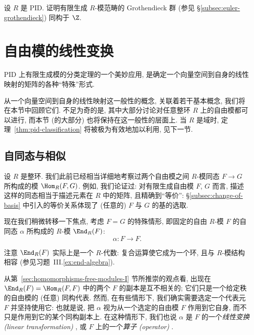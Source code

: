 \begin{prob}\label{ex:grothendieck-pid}
设 $R$ 是 PID. 证明有限生成 $R$-模范畴的 Grothendieck 群 (参见 §\ref{subsec:euler-grothendieck}) 同构于 $\Z$.
\end{prob}

\section{自由模的线性变换}
\label{sec:linear-transformations-free}

PID 上有限生成模的分类定理的一个美妙应用, 是确定一个向量空间到自身的线性映射的矩阵的各种``特殊''形式.

从一个向量空间到自身的线性映射这一般性的概念, 关联着若干基本概念, 我们将在本节中回顾它们. 不足为奇的是, 其中大部分讨论对任意整环 $R$ 上的自由模都可以进行, 而本节 (的大部分) 也将保持在这一般性的层面上. 当 $R$ 是域时, 定理~\ref{thm:pid-classification} 将被极为有效地加以利用, 见下一节.

\subsection{自同态与相似}
\label{subsec:endomorphisms-similarity}

设 $R$ 是整环. 我们此前已经相当详细地考察过两个自由模之间 $R$-模同态 $F\to G$ 所构成的模 $\Hom_R(F,G)$. 例如, 我们论证过: 对有限生成自由模 $F$, $G$ 而言, 描述这样的同态相当于描述元素在 $R$ 中的矩阵, 且精确到``等价'': §\ref{subsec:change-of-basis} 中引入的等价关系体现了 (任意的) $F$ 与 $G$ 的基的选取.

现在我们稍微转移一下焦点, 考虑 $F=G$ 的特殊情形, 即固定的自由 $R$-模 $F$ 的自同态 $\alpha$ 所构成的 $R$-模 $\End_R(F)$:
\[
\alpha:F\longrightarrow F.
\]

注意 $\End_R(F)$ 实际上是一个 $R$-代数: 复合运算使它成为一个环, 且与 $R$-模结构相容 (参见习题~III.\ref{ex:end-algebra}).

从第~\ref{sec:homomorphisms-free-modules-I} 节所推崇的观点看, 出现在 $\End_R(F)=\Hom_R(F,F)$ 中的两个 $F$ 的副本是互不相关的; 它们只是一个给定秩的自由模的 (任意) 同构代表. 然而, 在有些情形下, 我们确实需要选定一个代表元 $F$ 并坚持使用它: 也就是说, 把 $\alpha$ 视为从一个选定的自由模 $F$ 作用到它自身, 而不只是作用到它的某个同构副本上. 在这种情形下, 我们也说 $\alpha$ 是 $F$ 的一个\emph{线性变换 (linear transformation)}
, 或 $F$ 上的一个\emph{算子 (operator)}
.

